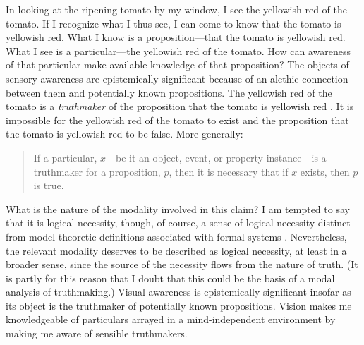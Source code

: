 \documentclass[12pt]{article}
\begin{document}
In looking at the ripening tomato by my window, I see the yellowish red of the tomato. If I recognize what I thus see, I can come to know that the tomato is yellowish red. What I know is a proposition---that the tomato is yellowish red. What I see is a particular---the yellowish red of the tomato. How can awareness of that particular make available knowledge of that proposition? The objects of sensory awareness are epistemically significant because of an alethic connection between them and potentially known propositions. The yellowish red of the tomato is a \emph{truthmaker} of the proposition that the tomato is yellowish red \citep[see][]{Johnston:2006uq}. It is impossible for the yellowish red of the tomato to exist and the proposition that the tomato is yellowish red to be false. More generally:
\begin{quote}
	If a particular, \( x \)---be it an object, event, or property instance---is a truthmaker for a proposition, \( p \), then it is necessary that if \( x \) exists, then \( p \) is true. 
\end{quote}
What is the nature of the modality involved in this claim? I am tempted to say that it is logical necessity, though, of course, a sense of logical necessity distinct from model-theoretic definitions associated with formal systems  \citep[for doubts about model-theoretic definitions of logical necessity see][]{Etchemendy:1988et,Etchemendy:1988sa}. Nevertheless, the relevant modality deserves to be described as logical necessity, at least in a broader sense, since the source of the necessity flows from the nature of truth. (It is partly for this reason that I doubt that this could be the basis of a modal analysis of truthmaking.) Visual awareness is epistemically significant insofar as its object is the truthmaker of potentially known propositions. Vision makes me knowledgeable of particulars arrayed in a mind-independent environment by making me aware of sensible truthmakers.

\end{document}
